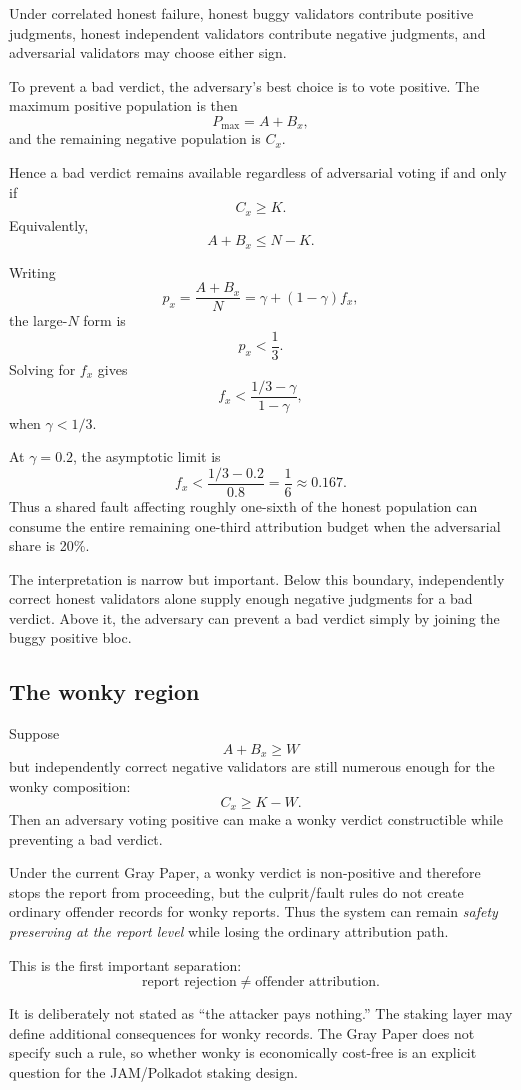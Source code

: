 Under correlated honest failure, honest buggy validators contribute positive judgments, honest independent validators contribute negative judgments, and adversarial validators may choose either sign.

To prevent a bad verdict, the adversary's best choice is to vote positive. The maximum positive population is then
\[
P_{\max}=A+B_x,
\]
and the remaining negative population is \(C_x\).

Hence a bad verdict remains available regardless of adversarial voting if and only if
\[
\boxed{
C_x\ge K.
}
\]
Equivalently,
\[
A+B_x\le N-K.
\]

Writing
\[
p_x=\frac{A+B_x}{N}=\gamma+(1-\gamma)f_x,
\]
the large-\(N\) form is
\[
\boxed{p_x<\frac13.}
\]
Solving for \(f_x\) gives
\[
\boxed{
 f_x<\frac{1/3-\gamma}{1-\gamma},
}
\]
when \(\gamma<1/3\).

At \(\gamma=0.2\), the asymptotic limit is
\[
f_x<\frac{1/3-0.2}{0.8}=\frac16\approx0.167.
\]
Thus a shared fault affecting roughly one-sixth of the honest population can consume the entire remaining one-third attribution budget when the adversarial share is 20\%.

The interpretation is narrow but important. Below this boundary, independently correct honest validators alone supply enough negative judgments for a bad verdict. Above it, the adversary can prevent a bad verdict simply by joining the buggy positive bloc.

\subsection{The wonky region}

Suppose
\[
A+B_x\ge W
\]
but independently correct negative validators are still numerous enough for the wonky composition:
\[
C_x\ge K-W.
\]
Then an adversary voting positive can make a wonky verdict constructible while preventing a bad verdict.

Under the current Gray Paper, a wonky verdict is non-positive and therefore stops the report from proceeding, but the culprit/fault rules do not create ordinary offender records for wonky reports. Thus the system can remain \emph{safety preserving at the report level} while losing the ordinary attribution path.

This is the first important separation:
\[
\boxed{
\text{report rejection}
\neq
\text{offender attribution}.
}
\]

It is deliberately not stated as “the attacker pays nothing.” The staking layer may define additional consequences for wonky records. The Gray Paper does not specify such a rule, so whether wonky is economically cost-free is an explicit question for the JAM/Polkadot staking design.


